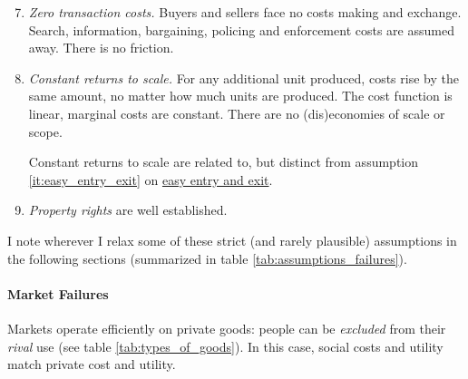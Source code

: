 \begin{enumerate} \setcounter{enumi}{6}
	\item \emph{Zero transaction costs.} \label{it:zero_transaction_costs}
		Buyers and sellers face no costs making and exchange. Search, information, bargaining, policing and enforcement costs are assumed away. There is no friction.
	\item \emph{Constant returns to scale.} \label{it:constant_returns_to_scale} 
		For any additional unit produced, costs rise by the same amount, no matter how much units are produced. The cost function is linear, marginal costs are constant. There are no (dis)economies of scale or scope. 
	
		Constant returns to scale are related to, but distinct from assumption \ref{it:easy_entry_exit} on \hyperref[it:easy_entry_exit]{easy entry and exit}.
	\item \emph{Property rights} \label{it:property_rights} are well established. 
\end{enumerate}

I note wherever I relax some of these strict (and rarely plausible) assumptions in the following sections (summarized in table \ref{tab:assumptions_failures}).

	

\paragraph{Market Failures}  \label{sec:market_failures} Markets operate efficiently on private goods: people can be \emph{excluded} from their \emph{rival} use (see table \ref{tab:types_of_goods}). In this case, social costs and utility match private cost and utility. 

